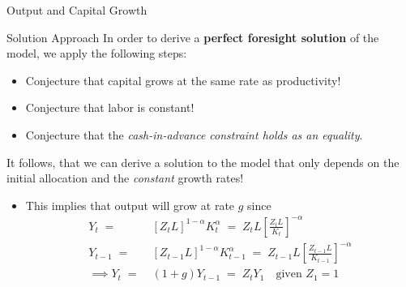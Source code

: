 \documentclass[10pt,c,aspectratio=1610,handout]{beamer}
\begin{document}
\begin{frame}{Output and Capital Growth}%
  \vspace{0.2in}%
  \begin{block}{Solution Approach}%
    In order to derive a \textbf{perfect foresight solution} of the model, we apply the following steps:\\%
    \vspace{-0.025in}%
    \begin{itemize}%
      \item[$\blacktriangleright$] Conjecture that capital grows at the same rate as productivity!
      \item[$\blacktriangleright$] Conjecture that labor is constant!%
      \item[$\blacktriangleright$] Conjecture that the \emph{cash-in-advance constraint holds as an equality}.%
    \end{itemize}%
    \vspace{-0.05in}%
    \pause%
    It follows, that we can derive a solution to the model that only depends on the initial allocation and the \emph{constant} growth rates!%
  \end{block}%
  \pause%
  \begin{itemize}%
    \item[$\blacktriangleright$] This implies that output will grow at rate $g$ since%
    \begin{align*}%
      Y_{t} \; = & \; \left[ Z_{t} L \right]^{1-\alpha} K_{t}^{\alpha} \; = \; Z_t L \left[\frac{Z_t L}{K_t}\right]^{-\alpha}\\%
      Y_{t-1} \; = & \; \left[ Z_{t-1} L \right]^{1-\alpha} K_{t-1}^{\alpha} \; = \; Z_{t-1} L \left[\frac{Z_{t-1} L}{K_{t-1}}\right]^{-\alpha}\\%
      \implies Y_{t} \; = & \; (1+g) Y_{t-1} \; = \; Z_{t} Y_{1} \quad \text{given } Z_1=1%
    \end{align*}%
  \end{itemize}%
  \vspace*{0.15in}%
\end{frame}%
\end{document}
